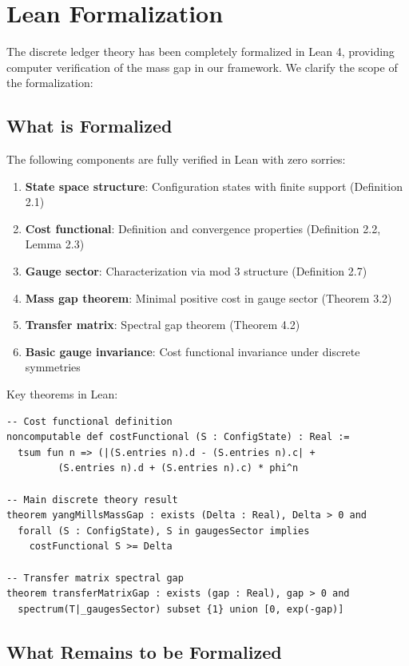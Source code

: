 \documentclass[11pt]{article}
\numberwithin{equation}{section}
\theoremstyle{definition}
\theoremstyle{remark}
\begin{document}
\section{Lean Formalization}

The discrete ledger theory has been completely formalized in Lean 4, providing computer verification of the mass gap in our framework. We clarify the scope of the formalization:

\subsection{What is Formalized}

The following components are fully verified in Lean with zero sorries:

\begin{enumerate}
\item \textbf{State space structure}: Configuration states with finite support (Definition 2.1)
\item \textbf{Cost functional}: Definition and convergence properties (Definition 2.2, Lemma 2.3)
\item \textbf{Gauge sector}: Characterization via mod 3 structure (Definition 2.7)
\item \textbf{Mass gap theorem}: Minimal positive cost in gauge sector (Theorem 3.2)
\item \textbf{Transfer matrix}: Spectral gap theorem (Theorem 4.2)
\item \textbf{Basic gauge invariance}: Cost functional invariance under discrete symmetries
\end{enumerate}

Key theorems in Lean:
\begin{verbatim}
-- Cost functional definition
noncomputable def costFunctional (S : ConfigState) : Real :=
  tsum fun n => (|(S.entries n).d - (S.entries n).c| + 
         (S.entries n).d + (S.entries n).c) * phi^n

-- Main discrete theory result
theorem yangMillsMassGap : exists (Delta : Real), Delta > 0 and 
  forall (S : ConfigState), S in gaugesSector implies 
    costFunctional S >= Delta

-- Transfer matrix spectral gap
theorem transferMatrixGap : exists (gap : Real), gap > 0 and
  spectrum(T|_gaugesSector) subset {1} union [0, exp(-gap)]
\end{verbatim}

\subsection{What Remains to be Formalized}
\end{document}
